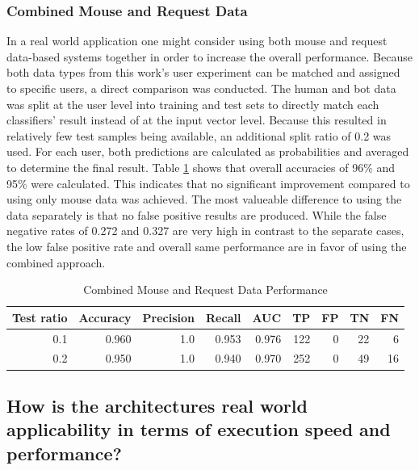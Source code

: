 \documentclass[
    fontsize=12pt,
    headings=small,
    parskip=half,           %
    bibliography=totoc,
    numbers=noenddot,       %
    open=any,               %
    final,                   %
    table
]{scrreprt}
\begin{document}
\subsubsection{Combined Mouse and Request Data}

In a real world application one might consider using both mouse and request data-based systems together in order to increase the overall performance. Because both data types from this work's user experiment can be matched and assigned to specific users, a direct comparison was conducted. The human and bot data was split at the user level into training and test sets to directly match each classifiers' result instead of at the input vector level. Because this resulted in relatively few test samples being available, an additional split ratio of 0.2 was used. For each user, both predictions are calculated as probabilities and averaged to determine the final result. Table \ref{table:combined_performance} shows that overall accuracies of 96\% and 95\% were calculated. This indicates that no significant improvement compared to using only mouse data was achieved. The most valueable difference to using the data separately is that no false positive results are produced. While the false negative rates of 0.272 and 0.327 are very high in contrast to the separate cases, the low false positive rate and overall same performance are in favor of using the combined approach.

\begin{table}[H]
    \begin{center}
        \begin{tabular*}{\textwidth}{rrrrrrrrr @{\extracolsep{\fill}}}
            \toprule
            Test ratio & Accuracy & Precision & Recall & AUC & TP & FP & TN & FN \\
            \midrule
            0.1 & 0.960 & 1.0 & 0.953 & 0.976 & 122 & 0 & 22 & 6 \\
            0.2 & 0.950 & 1.0 & 0.940 & 0.970 & 252 & 0 & 49 & 16 \\
            \bottomrule
        \end{tabular*}
    \end{center}
    \caption{Combined Mouse and Request Data Performance}
    \label{table:combined_performance}
\end{table}

\subsection{How is the architectures real world applicability in terms of execution speed and performance?}
\end{document}
